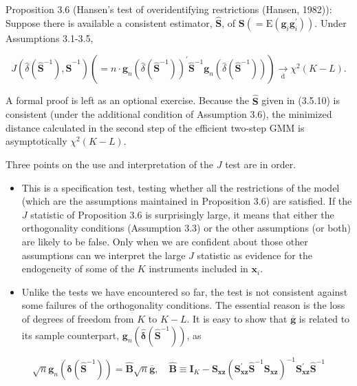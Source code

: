 \documentclass[10pt]{article}
\begin{document}
Proposition 3.6 (Hansen's test of overidentifying restrictions (Hansen, 1982)): Suppose there is available a consistent estimator, $\widehat{\mathbf{S}}$, of $\mathbf{S}\left(=\mathrm{E}\left(\mathbf{g}_{i} \mathbf{g}_{i}^{\prime}\right)\right)$. Under Assumptions 3.1-3.5,

$$
J\left(\hat{\delta}\left(\widehat{\mathbf{S}}^{-1}\right), \widehat{\mathbf{S}}^{-1}\right)\left(=n \cdot \mathbf{g}_{n}\left(\hat{\delta}\left(\widehat{\mathbf{S}}^{-1}\right)\right)^{\prime} \widehat{\mathbf{S}}^{-1} \mathbf{g}_{n}\left(\hat{\delta}\left(\widehat{\mathbf{S}}^{-1}\right)\right)\right) \underset{\mathrm{d}}{\longrightarrow} \chi^{2}(K-L) .
$$

A formal proof is left as an optional exercise. Because the $\widehat{\mathbf{S}}$ given in (3.5.10) is consistent (under the additional condition of Assumption 3.6), the minimized distance calculated in the second step of the efficient two-step GMM is asymptotically $\chi^{2}(K-L)$.

Three points on the use and interpretation of the $J$ test are in order.

\begin{itemize}
  \item This is a specification test, testing whether all the restrictions of the model (which are the assumptions maintained in Proposition 3.6) are satisfied. If the $J$ statistic of Proposition 3.6 is surprisingly large, it means that either the orthogonality conditions (Assumption 3.3) or the other assumptions (or both) are likely to be false. Only when we are confident about those other assumptions can we interpret the large $J$ statistic as evidence for the endogeneity of some of the $K$ instruments included in $\mathbf{x}_{i}$.
  \item Unlike the tests we have encountered so far, the test is not consistent against some failures of the orthogonality conditions. The essential reason is the loss of degrees of freedom from $K$ to $K-L$. It is easy to show that $\overline{\mathbf{g}}$ is related to its sample counterpart, $\mathbf{g}_{n}\left(\hat{\boldsymbol{\delta}}\left(\widehat{\mathbf{S}}^{-1}\right)\right)$, as
\end{itemize}


\begin{equation*}
\sqrt{n} \mathbf{g}_{n}\left(\hat{\boldsymbol{\delta}}\left(\widehat{\mathbf{S}}^{-1}\right)\right)=\widehat{\mathbf{B}} \sqrt{n} \overline{\mathbf{g}}, \quad \widehat{\mathbf{B}} \equiv \mathbf{I}_{K}-\mathbf{S}_{\mathbf{x z}}\left(\mathbf{S}_{\mathbf{x z}}^{\prime} \widehat{\mathbf{S}}^{-1} \mathbf{S}_{\mathbf{x z}}\right)^{-1} \mathbf{S}_{\mathbf{x z}}^{\prime} \widehat{\mathbf{S}}^{-1} \tag{3.6.2}
\end{equation*}
\end{document}
